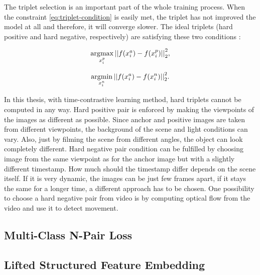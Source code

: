 The triplet selection is an important part of the whole training process. When the constraint \ref{eq:triplet-condition} is easily met, the triplet has not improved the model at all and therefore, it will converge slower. The ideal triplets (hard positive and hard negative, respectively) are satisfying these two conditions \cite{facenet-triplet-loss}:

\begin{equation}
    \label{eq:triplet-sel1}
    \operatorname*{arg\!\max}_{x^{p}_{i}}{{|| f(x^{a}_{i}) - f(x^{p}_{i}) ||}^{2}_{2}},
\end{equation}

\begin{equation}
    \label{eq:triplet-sel2}
    \operatorname*{arg\!\min}_{x^{n}_{i}}{{|| f(x^{a}_{i}) - f(x^{n}_{i}) ||}^{2}_{2}}.
\end{equation}

In this thesis, with time-contrastive learning method, hard triplets cannot be computed in any way. Hard positive pair is enforced by making the viewpoints of the images as different as possible. Since anchor and positive images are taken from different viewpoints, the background of the scene and light conditions can vary. Also, just by filming the scene from different angles, the object can look completely different. Hard negative pair condition can be fulfilled by choosing image from the same viewpoint as for the anchor image but with a slightly different timestamp. How much should the timestamp differ depends on the scene itself. If it is very dynamic, the images can be just few frames apart, if it stays the same for a longer time, a different approach has to be chosen. One possibility to choose a hard negative pair from video is by computing optical flow from the video and use it to detect movement.

\subsection{Multi-Class N-Pair Loss}

\blindtext

\blindtext

\blindtext

\subsection{Lifted Structured Feature Embedding}

\blindtext

\blindtext

\blindtext
